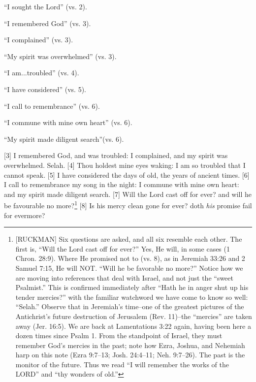 {\begin{compactenum}
\item “I sought the Lord” (vs. 2).
\item “I remembered God” (vs. 3).
\item “I complained” (vs. 3).
\item “My spirit was overwhelmed” (vs. 3).
\item “I am...troubled” (vs. 4).
\item “I have considered” (vs. 5).
\item “I call to remembrance” (vs. 6).
\item “I commune with mine own heart” (vs. 6).
\item “My spirit made diligent search”(vs. 6).
\end{compactenum} }
[3] \textcolor[rgb]{0.00,0.00,1.00}{I remembered God, and was troubled: I complained, and my spirit was overwhelmed. Selah.}
[4] \textcolor[rgb]{0.00,0.00,1.00}{Thou holdest mine eyes waking: I am so troubled that I cannot speak.}
[5] \textcolor[rgb]{0.00,0.00,1.00}{I have considered the days of old, the years of ancient times.}
[6] \textcolor[rgb]{0.00,0.00,1.00}{I call to remembrance my song in the night: I commune with mine own heart: and my spirit made diligent search.}
[7] \textcolor[rgb]{0.00,0.00,1.00}{Will the Lord cast off for ever? and will he be favourable no more?}\footnote{[RUCKMAN] Six questions are asked, and all six resemble each other. The first is, “Will the Lord cast off for ever?” Yes, He will, in some cases (1 Chron. 28:9). Where He promised not to (vs. 8), as in Jeremiah 33:26 and 2 Samuel 7:15, He will NOT. “Will he be favorable no more?” Notice how we are moving into references that deal with Israel, and not just the “sweet Psalmist.” This is confirmed immediately after “Hath he in anger shut up his tender mercies?” with the familiar watchword we have come to know so well: “Selah.” Observe that in Jeremiah’s time--one of the greatest pictures of the Antichrist’s future destruction of Jerusalem (Rev. 11)--the “mercies” are taken away (Jer. 16:5). We are back at Lamentations 3:22 again, having been here a dozen times since Psalm 1. From the standpoint of Israel, they must remember God’s mercies in the past; note how Ezra, Joshua, and Nehemiah harp on this note (Ezra 9:7--13; Josh. 24:4--11; Neh. 9:7--26). The past is the monitor of the future. Thus we read “I will remember the works of the LORD” and “thy wonders of old.”\cite{Ruckman1992Psalms}}
[8] \textcolor[rgb]{0.00,0.00,1.00}{Is his mercy clean gone for ever? doth \emph{his} promise fail for evermore?}
